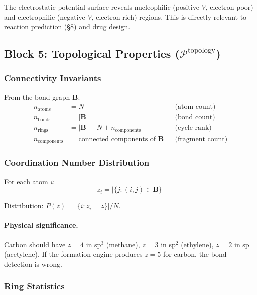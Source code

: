 \documentclass[11pt, a4paper, oneside]{article}
\theoremstyle{definition}
\theoremstyle{remark}
\begin{document}
The electrostatic potential surface reveals nucleophilic
(positive $V$, electron-poor) and electrophilic (negative $V$,
electron-rich) regions.  This is directly relevant to reaction
prediction (\S8) and drug design.

\subsection{Block 5: Topological Properties ($\mathcal{P}^{\text{topology}}$)}
\label{sec:block-topology}

\subsubsection{Connectivity Invariants}

From the bond graph $\mathbf{B}$:
\begin{align}
n_{\text{atoms}} &= N  && \text{(atom count)} \\
n_{\text{bonds}} &= |\mathbf{B}|  && \text{(bond count)} \\
n_{\text{rings}} &= |\mathbf{B}| - N + n_{\text{components}}
  && \text{(cycle rank)} \\
n_{\text{components}} &= \text{connected components of } \mathbf{B}
  && \text{(fragment count)}
\end{align}

\subsubsection{Coordination Number Distribution}

For each atom $i$:
\begin{equation}
z_i = |\{j : (i,j) \in \mathbf{B}\}|
\end{equation}

Distribution: $P(z) = |\{i : z_i = z\}| / N$.

\paragraph{Physical significance.}
Carbon should have $z = 4$ in sp$^3$ (methane), $z = 3$ in sp$^2$
(ethylene), $z = 2$ in sp (acetylene).  If the formation engine produces
$z = 5$ for carbon, the bond detection is wrong.

\subsubsection{Ring Statistics}
\end{document}

